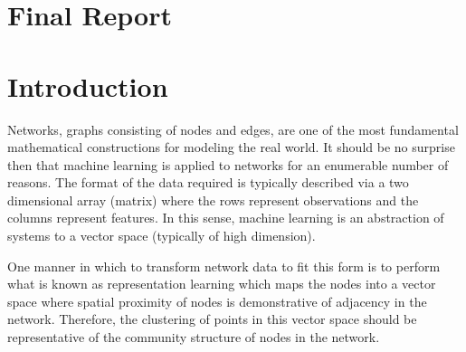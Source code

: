 \documentclass[letter,10pt,openany]{article}
\begin{document}
\section{Final Report}


\section{Introduction}

Networks, graphs consisting of nodes and edges, are one of the
most fundamental mathematical constructions for modeling
the real world. It should be no surprise then that machine
learning is applied to networks for an enumerable number of
reasons. The format of the data required is typically described
via a two dimensional array (matrix) where the rows represent
observations and the columns represent features. In this sense, machine learning
is an abstraction of systems to a vector space (typically of high dimension).

One manner in which to transform network data to fit this form is
to perform what is known as representation learning which maps
the nodes into a vector space where spatial proximity of nodes
is demonstrative of adjacency in the network.
Therefore, the clustering of points in this vector space should be
representative of the community structure of nodes in the network.
\end{document}

